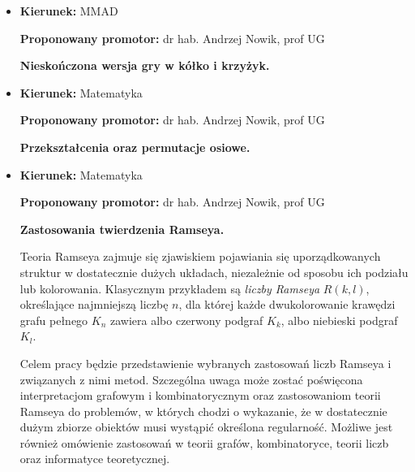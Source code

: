\documentclass[12pt,a4paper]{article}
\begin{document}
\begin{itemize}
\begin{enumerate}[leftmargin=*]
    \item S. W. Golomb, \emph{A connected topology for the integers},
    American Mathematical Monthly 66(8) (1959), 663--665.

    \item A. M. Kirch, \emph{A countable, connected, locally connected
    Hausdorff space}, American Mathematical Monthly 76(2) (1969),
    169--171.

    \item L. A. Steen, J. A. Seebach Jr.,
    \emph{Counterexamples in Topology}, wyd.~2,
    Springer-Verlag, 1978.

    \item P. Szyszkowska (Szczuka),
    \emph{Properties of the division topology on the set of positive
    integers}, International Journal of Number Theory 12(3) (2016),
    775--785.
\end{enumerate}

\item
  
\noindent
\textbf{Kierunek:} MMAD

\noindent
\textbf{Proponowany promotor:} dr hab. Andrzej Nowik, prof UG

\bigskip
  \textbf{Nieskończona wersja gry w kółko i krzyżyk.}

\item
  
\noindent
\textbf{Kierunek:} Matematyka

\noindent
\textbf{Proponowany promotor:} dr hab. Andrzej Nowik, prof UG

\bigskip
  \textbf{Przekształcenia oraz permutacje osiowe.}
 
\item
\noindent
\textbf{Kierunek:} Matematyka

\noindent
\textbf{Proponowany promotor:} dr hab. Andrzej Nowik, prof UG

\bigskip
  \textbf{Zastosowania twierdzenia Ramseya.}
  
Teoria Ramseya zajmuje się zjawiskiem pojawiania się uporządkowanych struktur
w dostatecznie dużych układach, niezależnie od sposobu ich podziału lub
kolorowania. Klasycznym przykładem są \emph{liczby Ramseya} $R(k,l)$,
określające najmniejszą liczbę $n$, dla której każde dwukolorowanie krawędzi
grafu pełnego $K_n$ zawiera albo czerwony podgraf $K_k$, albo niebieski
podgraf $K_l$.

Celem pracy będzie przedstawienie wybranych zastosowań liczb Ramseya i
związanych z nimi metod. Szczególna uwaga może zostać poświęcona
interpretacjom grafowym i kombinatorycznym oraz zastosowaniom teorii Ramseya
do problemów, w których chodzi o wykazanie, że w dostatecznie dużym zbiorze
obiektów musi wystąpić określona regularność. Możliwe jest również omówienie
zastosowań w teorii grafów, kombinatoryce, teorii liczb oraz informatyce
teoretycznej.


\end{itemize}
\end{document}
